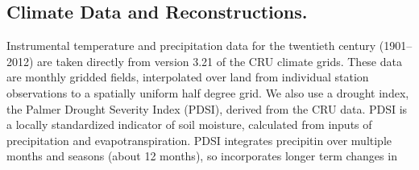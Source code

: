 \documentclass{nature}
\begin{document}
\begin{methods}

\subsection{Climate Data and Reconstructions.}
\noindent Instrumental temperature and precipitation data for the twentieth century (1901--2012) are taken directly from version 3.21 of the CRU climate grids\cite{Harris2014}. These data are monthly gridded fields, interpolated over land from individual station observations to a spatially uniform half degree grid. We also use a drought index, the Palmer Drought Severity Index (PDSI\cite{Palmer:1965}), derived from the CRU data\cite{Schrier2013}. PDSI is a locally standardized indicator of soil moisture, calculated from inputs of precipitation and evapotranspiration. PDSI integrates precipitin over multiple months and seasons (about 12 months), so incorporates longer term changes in 
\end{methods}
\end{document}
